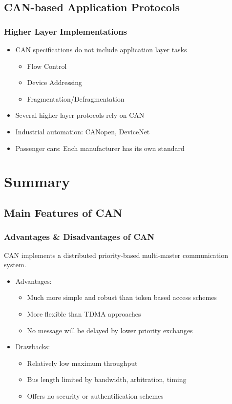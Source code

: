 \documentclass{beamer}
\begin{document}
\subsection{CAN-based Application Protocols}
\begin{frame}
	\frametitle{Higher Layer Implementations}
	\begin{itemize}
		\item CAN specifications do not include application layer tasks
		\begin{itemize}
			\item Flow Control
			\item Device Addressing
			\item Fragmentation/Defragmentation
		\end{itemize}
		\item Several higher layer protocols rely on CAN
		\item Industrial automation: CANopen, DeviceNet
		\item Passenger cars: Each manufacturer has its own standard
	\end{itemize}
\end{frame}

\section{Summary}
\subsection{Main Features of CAN}
\begin{frame}
	\frametitle{Advantages \& Disadvantages of CAN}
	CAN implements a distributed priority-based multi-master communication system.
	\vfill
	\begin{itemize}
		\item Advantages:
		\begin{itemize}
			\item Much more simple and robust than token based access schemes
			\item More flexible than TDMA approaches
			\item No message will be delayed by lower priority exchanges
		\end{itemize}
		\item Drawbacks:
		\begin{itemize}
			\item Relatively low maximum throughput
			\item Bus length limited by bandwidth, arbitration, timing
			\item Offers no security or authentification schemes
		\end{itemize}
	\end{itemize}
\end{frame}
\end{document}
